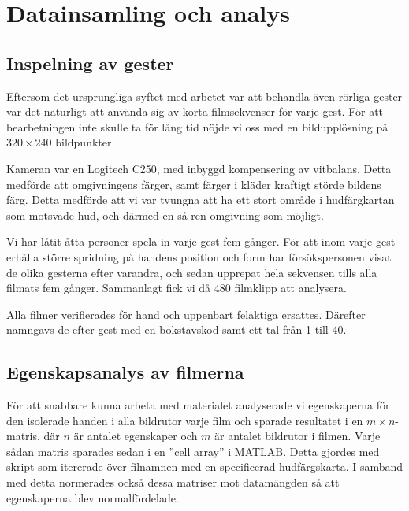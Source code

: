\documentclass[../rapport_MVEX01-11-05]{subfiles}
\begin{document}
\section{Datainsamling och analys}

\subsection{Inspelning av gester}
Eftersom det ursprungliga syftet med arbetet var att behandla även rörliga
gester var det naturligt att använda sig av korta filmsekvenser för varje gest.
För att bearbetningen inte skulle ta för lång tid nöjde vi oss med en
bildupplösning på $320\times240$ bildpunkter.

Kameran var en Logitech C250, med inbyggd kompensering av vitbalans. Detta
medförde att omgivningens färger, samt färger i kläder kraftigt störde bildens 
färg. Detta medförde att vi var tvungna att ha ett stort område i hudfärgkartan
som motsvade hud, och därmed en så ren omgivning som möjligt.

Vi har låtit åtta personer spela in varje gest fem gånger.
För att inom varje gest erhålla större spridning på handens position och form
har försökspersonen visat de olika gesterna efter varandra, och sedan
upprepat hela sekvensen tills alla filmats fem gånger. Sammanlagt fick vi då 480
filmklipp att analysera.

Alla filmer verifierades för hand och uppenbart felaktiga ersattes. Därefter
namngavs de efter gest med en bokstavskod samt ett tal från 1 till 40.

\subsection{Egenskapsanalys av filmerna}
För att snabbare kunna arbeta med materialet analyserade vi
egenskaperna för den isolerade handen i alla bildrutor varje film och sparade
resultatet i en $m\times n$-matris, där $n$ är antalet egenskaper och $m$ är
antalet bildrutor i filmen. Varje sådan matris sparades sedan i en ''cell array''
i MATLAB. Detta gjordes med skript som itererade över filnamnen
med en specificerad hudfärgskarta. I samband med detta normerades också dessa
matriser mot datamängden så att egenskaperna blev normalfördelade.
\end{document}
